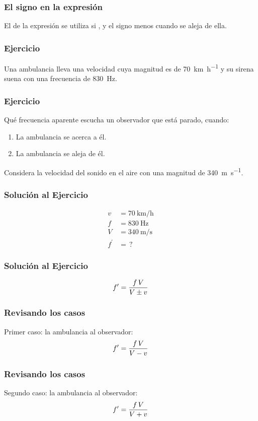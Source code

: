 \documentclass[14pt]{beamer}
\begin{document}
\begin{frame}
\frametitle{El signo en la expresión}
El  de la expresión se utiliza si , \pause y el signo menos cuando se aleja de ella.
\end{frame}
\begin{frame}
\frametitle{Ejercicio}
Una ambulancia lleva una velocidad cuya magnitud es de \SI{70}{\kilo\meter\per\hour} y su sirena suena con una frecuencia de \SI{830}{\hertz}.
\end{frame}
\begin{frame}
\frametitle{Ejercicio}
Qué frecuencia aparente escucha un observador que está parado, cuando:
\begin{enumerate}[<+->]
\item La ambulancia se acerca a él.
\item La ambulancia se aleja de él.
\end{enumerate}
Considera la velocidad del sonido en el aire con una magnitud de \SI{340}{\meter\per\second}.
\end{frame}
\begin{frame}
\frametitle{Solución al Ejercicio}
\pause
\begin{align*}
v &= \SI{70}{\kilo\meter\per\hour} \\
f &= \SI{830}{\hertz} \\
V &= \SI{340}{\meter\per\second} \\
f^{\prime} &= \, ?
\end{align*}
\end{frame}
\begin{frame}
\frametitle{Solución al Ejercicio}
\begin{align*}
{f}^{\prime} = \dfrac{f \, V}{V \pm v}
\end{align*}
\end{frame}
\begin{frame}
\frametitle{Revisando los casos}
Primer caso: la ambulancia  al observador:
\pause
\begin{align*}
{f}^{\prime} = \dfrac{f \, V}{V - v}
\end{align*}
\end{frame}
\begin{frame}
\frametitle{Revisando los casos}
Segundo caso: la ambulancia  al observador:
\pause
\begin{align*}
{f}^{\prime} = \dfrac{f \, V}{V + v}
\end{align*}
\end{frame}
\end{document}
